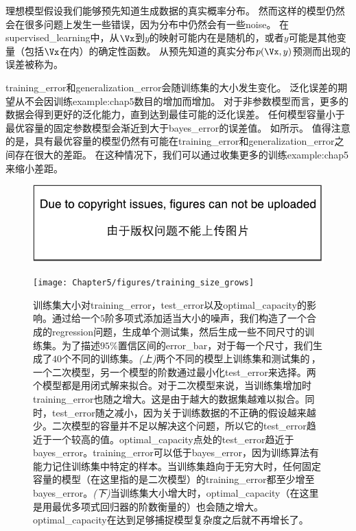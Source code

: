 
理想模型假设我们能够预先知道生成数据的真实概率分布。
然而这样的模型仍然会在很多问题上发生一些错误，因为分布中仍然会有一些\gls{noise}。
在\gls{supervised_learning}中，从$\Vx$到$y$的映射可能内在是随机的，或者$y$可能是其他变量（包括$\Vx$在内）的确定性函数。
从预先知道的真实分布$p(\Vx,y)$预测而出现的误差被称为。

\gls{training_error}和\gls{generalization_error}会随训练集的大小发生变化。
泛化误差的期望从不会因训练\gls{example:chap5}数目的增加而增加。
对于非参数模型而言，更多的数据会得到更好的泛化能力，直到达到最佳可能的泛化误差。
任何模型容量小于最优容量的固定参数模型会渐近到大于\gls{bayes_error}的误差值。
如所示。
值得注意的是，具有最优容量的模型仍然有可能在\gls{training_error}和\gls{generalization_error}之间存在很大的差距。
在这种情况下，我们可以通过收集更多的训练\gls{example:chap5}来缩小差距。

\begin{figure}[!htb]
\ifOpenSource
\centerline{\includegraphics{figure.pdf}}
\else
\centerline{\texttt{[image: Chapter5/figures/training\_size\_grows]}}
\fi
\caption{训练集大小对\gls{training_error}，\gls{test_error}以及\gls{optimal_capacity}的影响。通过给一个$5$阶多项式添加适当大小的噪声，我们构造了一个合成的\gls{regression}问题，生成单个测试集，然后生成一些不同尺寸的训练集。为了描述$95\%$置信区间的\gls{error_bar}，对于每一个尺寸，我们生成了$40$个不同的训练集。\emph{(上)}两个不同的模型上训练集和测试集的\,，一个二次模型，另一个模型的阶数通过最小化\gls{test_error}来选择。两个模型都是用闭式解来拟合。对于二次模型来说，当训练集增加时\gls{training_error}也随之增大。这是由于越大的数据集越难以拟合。同时，\gls{test_error}随之减小，因为关于训练数据的不正确的假设越来越少。二次模型的容量并不足以解决这个问题，所以它的\gls{test_error}趋近于一个较高的值。\gls{optimal_capacity}点处的\gls{test_error}趋近于\gls{bayes_error}。\gls{training_error}可以低于\gls{bayes_error}，因为训练算法有能力记住训练集中特定的样本。当训练集趋向于无穷大时，任何固定容量的模型（在这里指的是二次模型）的\gls{training_error}都至少增至\gls{bayes_error}。\emph{(下)}当训练集大小增大时，\gls{optimal_capacity}（在这里是用最优多项式回归器的阶数衡量的）也会随之增大。\gls{optimal_capacity}在达到足够捕捉模型复杂度之后就不再增长了。}
\label{fig:chap5_training_size_grows}
\end{figure}

